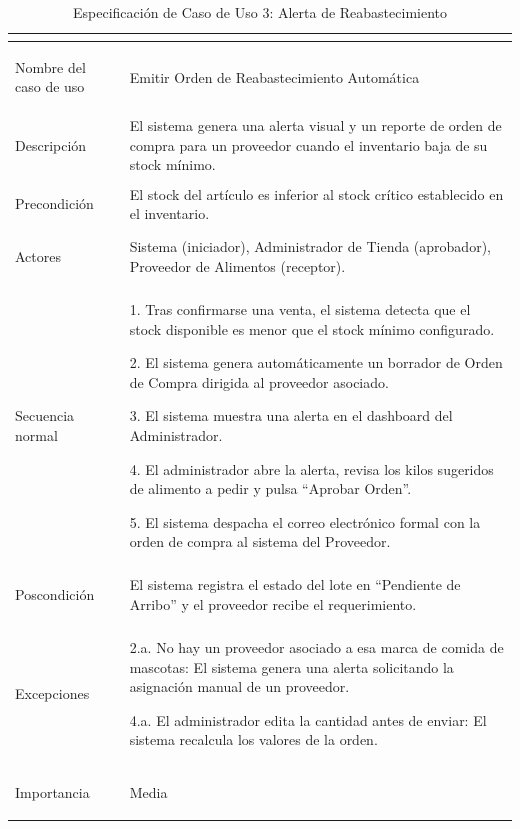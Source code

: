 \newpage
\begin{table}[H]
    \centering
    \small
    \renewcommand{\arraystretch}{1.4}
    \begin{tabularx}{\textwidth}{|>{\bfseries\raggedright\arraybackslash}p{4cm}|L|}
        \hline
          \\
        \hline
        Nombre del caso de uso & Emitir Orden de Reabastecimiento Automática \\
        \hline
        Descripción & El sistema genera una alerta visual y un reporte de orden de compra para un proveedor cuando el inventario baja de su stock mínimo. \\
        \hline
        Precondición & El stock del artículo es inferior al stock crítico establecido en el inventario. \\
        \hline
        Actores & Sistema (iniciador), Administrador de Tienda (aprobador), Proveedor de Alimentos (receptor). \\
        \hline
        Secuencia normal & 
        1. Tras confirmarse una venta, el sistema detecta que el stock disponible es menor que el stock mínimo configurado. \par
        2. El sistema genera automáticamente un borrador de Orden de Compra dirigida al proveedor asociado. \par
        3. El sistema muestra una alerta en el dashboard del Administrador. \par
        4. El administrador abre la alerta, revisa los kilos sugeridos de alimento a pedir y pulsa ``Aprobar Orden''. \par
        5. El sistema despacha el correo electrónico formal con la orden de compra al sistema del Proveedor. \\
        \hline
        Poscondición & El sistema registra el estado del lote en ``Pendiente de Arribo'' y el proveedor recibe el requerimiento. \\
        \hline
        Excepciones & 
        2.a. No hay un proveedor asociado a esa marca de comida de mascotas: El sistema genera una alerta solicitando la asignación manual de un proveedor. \par
        4.a. El administrador edita la cantidad antes de enviar: El sistema recalcula los valores de la orden. \\
        \hline
        Importancia & Media \\
        \hline
    \end{tabularx}
    \caption{Especificación de Caso de Uso 3: Alerta de Reabastecimiento}
    \label{tab:especificacion_cu3}
\end{table}